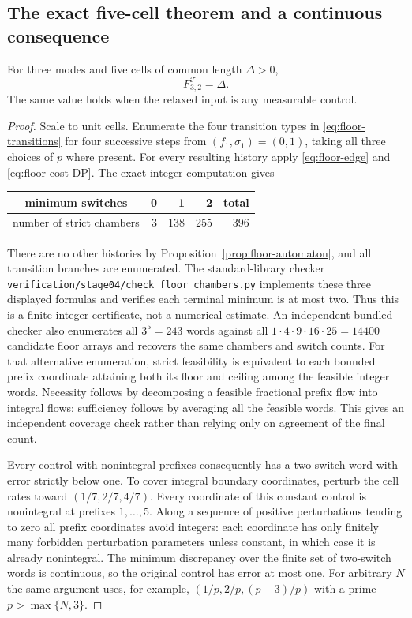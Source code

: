 \subsection{The exact five-cell theorem and a continuous consequence}
\begin{theorem}\label{thm:five-cells}
For three modes and five cells of common length $\Delta>0$,
\begin{equation}\label{eq:five-cells}
 F^{\mathcal T}_{3,2}=\Delta.
\end{equation}
The same value holds when the relaxed input is any measurable control.
\end{theorem}
\begin{proof}
Scale to unit cells. Enumerate the four transition types in
\eqref{eq:floor-transitions} for four successive steps from
$(f_1,\sigma_1)=(0,1)$, taking all three choices of $p$ where present.
For every resulting history apply \eqref{eq:floor-edge} and
\eqref{eq:floor-cost-DP}. The exact integer computation gives
\begin{center}
\begin{tabular}{c|rrr|r}
minimum switches&0&1&2&total\\\hline
number of strict chambers&3&138&255&396
\end{tabular}
\end{center}
There are no other histories by Proposition~\ref{prop:floor-automaton},
and all transition branches are enumerated. The standard-library checker
\texttt{verification/stage04/check\_floor\_chambers.py} implements these
three displayed formulas and verifies each terminal minimum is at most two.
Thus this is a finite integer certificate, not a numerical estimate.
An independent bundled checker also enumerates all $3^5=243$ words against
all $1\cdot4\cdot9\cdot16\cdot25=14400$ candidate floor arrays and
recovers the same chambers and switch counts.
For that alternative enumeration, strict feasibility is equivalent to each
bounded prefix coordinate attaining both its floor and ceiling among the
feasible integer words. Necessity follows by decomposing a feasible
fractional prefix flow into integral flows; sufficiency follows by averaging
all the feasible words. This gives an independent coverage check rather
than relying only on agreement of the final count.

Every control with nonintegral prefixes consequently has a two-switch
word with error strictly below one. To cover integral boundary coordinates,
perturb the cell rates toward $(1/7,2/7,4/7)$. Every coordinate of this
constant control is nonintegral at prefixes $1,\ldots,5$. Along a sequence
of positive perturbations tending to zero all prefix coordinates avoid
integers: each coordinate has only finitely many forbidden perturbation
parameters unless constant, in which case it is already nonintegral.
The minimum discrepancy over the finite set of two-switch words is
continuous, so the original control has error at most one.
For arbitrary $N$ the same argument uses, for example,
$(1/p,2/p,(p-3)/p)$ with a prime $p>\max\{N,3\}$.


\end{proof}
